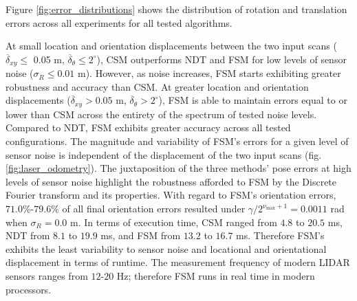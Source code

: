 Figure \ref{fig:error_distributions} shows the distribution of rotation and
translation errors across all experiments for all tested algorithms.

\begin{figure*}\hspace{-0.25cm}
    \subfloat{}
    \qquad \hspace{-1.5cm}
    \subfloat{}
    \vspace{-2.5cm}
    \caption{\small Distribution of orientation and position errors across a
             range of maximal positional and orientational displacements, for
             progressively larger sensor measurement noise levels. FSM's errors
             are largely independent of the initial displacement of scans for a
             given level of sensor noise}%
    \label{fig:error_distributions}%
\end{figure*}

At small location and orientation displacements between the two input scans
($\overline{\delta}_{xy} \leq $ 0.05 m,
$\overline{\delta}_\theta \leq 2^\circ$), CSM outperforms NDT and FSM for low
levels of sensor noise ($\sigma_R \leq 0.01$ m). However, as noise increases,
FSM starts exhibiting greater robustness and accuracy than CSM. At greater
location and orientation displacements
($\overline{\delta}_{xy} > 0.05$ m, $\overline{\delta}_\theta > 2^\circ$), FSM
is able to maintain errors equal to or lower than CSM across the entirety of
the spectrum of tested noise levels. Compared to NDT, FSM exhibits greater
accuracy across all tested configurations. The magnitude and variability of
FSM's errors for a given level of sensor noise is independent of the
displacement of the two input scans (fig. \ref{fig:laser_odometry}). The
juxtaposition of the three methods' pose errors at high levels of sensor noise
highlight the robustness afforded to FSM by the Discrete Fourier transform and
its properties. With regard to FSM's orientation errors, $71.0\%$-$79.6\%$ of
all final orientation errors resulted under $\gamma / 2^{\nu_{\max}+1} =
0.0011$ rad when $\sigma_R = 0.0$ m. In terms of execution time, CSM ranged
from $4.8$ to $20.5$ ms, NDT from $8.1$ to $19.9$ ms, and FSM from $13.2$ to
$16.7$ ms. Therefore FSM's exhibits the least variability to sensor noise and
locational and orientational displacement in terms of runtime.  The measurement
frequency of modern LIDAR sensors ranges from $12$-$20$ Hz; therefore FSM runs
in real time in modern processors.
